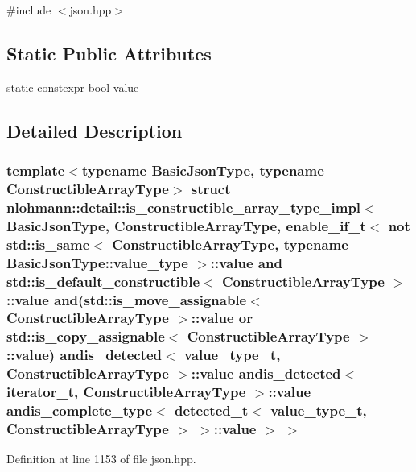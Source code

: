 {\ttfamily \#include $<$json.\+hpp$>$}

\subsection*{Static Public Attributes}
\begin{DoxyCompactItemize}
\item 
static constexpr bool \mbox{\hyperlink{structnlohmann_1_1detail_1_1is__constructible__array__type__impl_3_01_basic_json_type_00_01_cons437c79c936c626a4ffcf289ee9218c26_a39e2baa94bee9c7abed5e3cada4bf184}{value}}
\end{DoxyCompactItemize}


\subsection{Detailed Description}
\subsubsection*{template$<$typename Basic\+Json\+Type, typename Constructible\+Array\+Type$>$\newline
struct nlohmann\+::detail\+::is\+\_\+constructible\+\_\+array\+\_\+type\+\_\+impl$<$ Basic\+Json\+Type, Constructible\+Array\+Type, enable\+\_\+if\+\_\+t$<$ not std\+::is\+\_\+same$<$ Constructible\+Array\+Type, typename Basic\+Json\+Type\+::value\+\_\+type $>$\+::value and std\+::is\+\_\+default\+\_\+constructible$<$ Constructible\+Array\+Type $>$\+::value and(std\+::is\+\_\+move\+\_\+assignable$<$ Constructible\+Array\+Type $>$\+::value or std\+::is\+\_\+copy\+\_\+assignable$<$ Constructible\+Array\+Type $>$\+::value) andis\+\_\+detected$<$ value\+\_\+type\+\_\+t, Constructible\+Array\+Type $>$\+::value andis\+\_\+detected$<$ iterator\+\_\+t, Constructible\+Array\+Type $>$\+::value andis\+\_\+complete\+\_\+type$<$ detected\+\_\+t$<$ value\+\_\+type\+\_\+t, Constructible\+Array\+Type $>$ $>$\+::value $>$ $>$}



Definition at line 1153 of file json.\+hpp.



